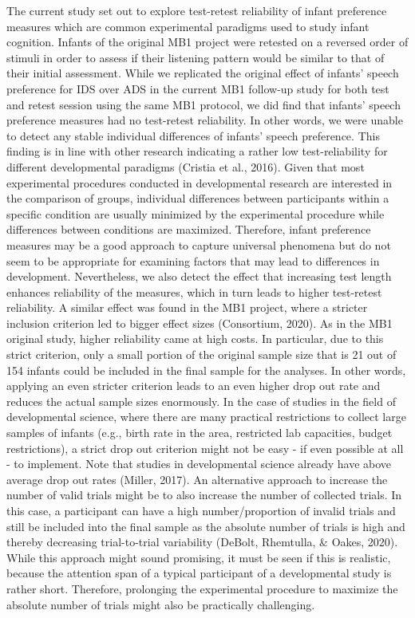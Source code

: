 \documentclass[
  english,
  man,floatsintext]{apa6}
\begin{document}
The current study set out to explore test-retest reliability of infant preference measures which are common experimental paradigms used to study infant cognition. Infants of the original MB1 project were retested on a reversed order of stimuli in order to assess if their listening pattern would be similar to that of their initial assessment. While we replicated the original effect of infants' speech preference for IDS over ADS in the current MB1 follow-up study for both test and retest session using the same MB1 protocol, we did find that infants' speech preference measures had no test-retest reliability. In other words, we were unable to detect any stable individual differences of infants' speech preference. This finding is in line with other research indicating a rather low test-reliability for different developmental paradigms (Cristia et al., 2016). Given that most experimental procedures conducted in developmental research are interested in the comparison of groups, individual differences between participants within a specific condition are usually minimized by the experimental procedure while differences between conditions are maximized. Therefore, infant preference measures may be a good approach to capture universal phenomena but do not seem to be appropriate for examining factors that may lead to differences in development.
Nevertheless, we also detect the effect that increasing test length enhances reliability of the measures, which in turn leads to higher test-retest reliability. A similar effect was found in the MB1 project, where a stricter inclusion criterion led to bigger effect sizes (Consortium, 2020). As in the MB1 original study, higher reliability came at high costs. In particular, due to this strict criterion, only a small portion of the original sample size that is 21 out of 154 infants could be included in the final sample for the analyses. In other words, applying an even stricter criterion leads to an even higher drop out rate and reduces the actual sample sizes enormously. In the case of studies in the field of developmental science, where there are many practical restrictions to collect large samples of infants (e.g., birth rate in the area, restricted lab capacities, budget restrictions), a strict drop out criterion might not be easy - if even possible at all - to implement. Note that studies in developmental science already have above average drop out rates (Miller, 2017).
An alternative approach to increase the number of valid trials might be to also increase the number of collected trials. In this case, a participant can have a high number/proportion of invalid trials and still be included into the final sample as the absolute number of trials is high and thereby decreasing trial-to-trial variability (DeBolt, Rhemtulla, \& Oakes, 2020). While this approach might sound promising, it must be seen if this is realistic, because the attention span of a typical participant of a developmental study is rather short. Therefore, prolonging the experimental procedure to maximize the absolute number of trials might also be practically challenging.
\end{document}
